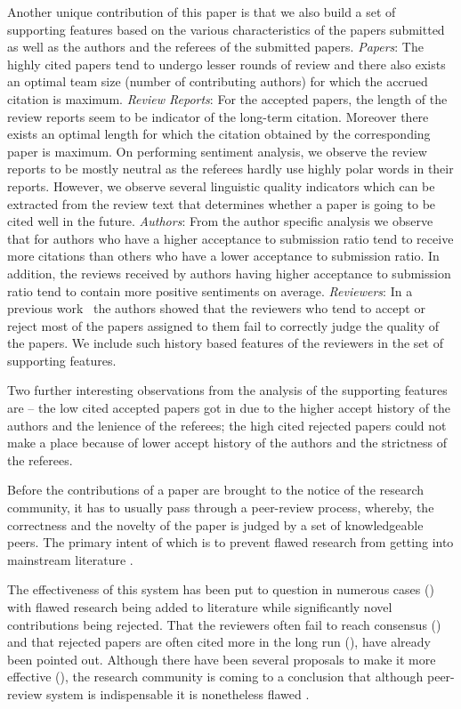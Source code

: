  Another unique contribution of this paper is that we also build a set of supporting features based on the various characteristics of the papers submitted as well as the authors and the referees of the submitted papers. {\em Papers}: The highly cited papers tend to undergo lesser rounds of review and there also exists an optimal team size (number of contributing authors) for which the accrued citation is maximum.
{\em Review Reports}: For the accepted papers, the length of the review reports seem to be indicator of the long-term citation. Moreover there exists an optimal length for which the citation obtained by the corresponding paper is maximum. On performing sentiment analysis, we observe the review reports to be mostly neutral as the referees hardly use highly polar words in their reports. However, we observe several linguistic quality indicators which can be extracted from the review text that determines whether a paper is going to be cited well in the future. {\em Authors}: From the author specific analysis we observe that for authors who have a higher acceptance to submission ratio tend to receive more citations than others who have a lower acceptance to submission ratio. In addition, the reviews received by authors having higher acceptance to submission ratio tend to contain more positive sentiments on average. {\em Reviewers}: In a previous work~\cite{sikdar2016anomalies} the authors showed that the reviewers who tend to accept or reject most of the papers assigned to them fail to correctly judge the quality of the papers. We include such history based features of the reviewers in the set of supporting features. 

Two further interesting observations from the analysis of the supporting features are -- the low cited accepted papers got in due to the higher accept history of the authors and the lenience of the referees; the high cited rejected papers could not make a place because of lower accept history of the authors and the strictness of the referees.

Before the contributions of a paper are brought to the notice of the research community, it has to usually pass through a peer-review process, whereby, the correctness and the novelty of the paper is judged by a set of knowledgeable peers. The primary intent of which is to prevent flawed research from getting into mainstream literature \cite{kassirer1994peer}. 

The effectiveness of this system has been put to question in numerous cases (\cite{ingelfinger1974peer,relman1989good,smith2006peer}) with flawed research being added to literature while significantly novel contributions being rejected. That the reviewers often fail to reach consensus (\cite{cole1981chance}) and that rejected papers are often cited more in the long run (\cite{braatz2014papers}), have already been pointed out. Although there have been several proposals to make it more effective (\cite{caswellimproving,graffy2006improving,mcnutt1990effects}), 
the research community is coming to a conclusion that although peer-review system is indispensable it is nonetheless flawed \cite{bacchetti2002peer}. 

